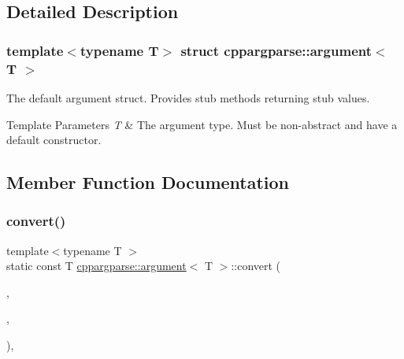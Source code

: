 \subsection{Detailed Description}
\subsubsection*{template$<$typename T$>$\newline
struct cppargparse\+::argument$<$ T $>$}

The default argument struct. Provides stub methods returning stub values. 


\begin{DoxyTemplParams}{Template Parameters}
{\em T} & The argument type. Must be non-\/abstract and have a default constructor. \\
\hline
\end{DoxyTemplParams}


\subsection{Member Function Documentation}
\mbox{\label{structcppargparse_1_1argument_a2051f71ef4ed0b9d299cc58bb494e42b}} 
\subsubsection{\texorpdfstring{convert()}{convert()}}
{\footnotesize\ttfamily template$<$typename T $>$ \\
static const T \hyperlink{structcppargparse_1_1argument}{cppargparse\+::argument}$<$ T $>$\+::convert (\begin{DoxyParamCaption}\item[{const \hyperlink{types_8h_a80adf2418b7ce9fe616698efa7533ecf}{types\+::\+Command\+Line\+\_\+t} \&}]{,  }\item[{const \hyperlink{types_8h_a43b4f43f8940de1bf09ced6f1b668053}{types\+::\+Command\+Line\+Position\+\_\+t} \&}]{,  }\item[{const \hyperlink{types_8h_a003c660afe2ee9c6cc39aea966e8926d}{types\+::\+Command\+Line\+Arguments\+\_\+t} \&}]{ }\end{DoxyParamCaption})\hspace{0.3cm}{\ttfamily [inline]}, {\ttfamily [static]}}



